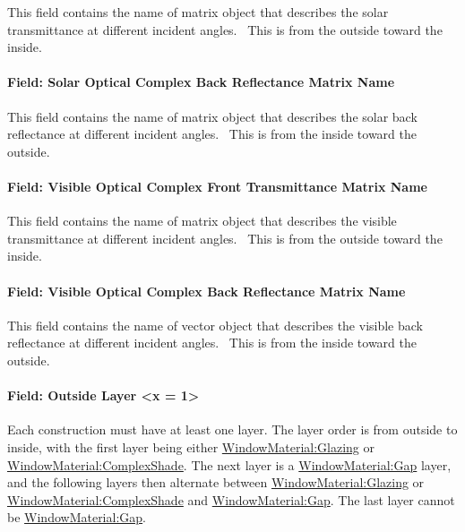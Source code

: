 This field contains the name of matrix object that describes the solar transmittance at different incident angles.~ This is from the outside toward the inside.

\paragraph{Field: Solar Optical Complex Back Reflectance Matrix Name}\label{field-solar-optical-complex-back-reflectance-matrix-name}

This field contains the name of matrix object that describes the solar back reflectance at different incident angles.~ This is from the inside toward the outside.

\paragraph{Field: Visible Optical Complex Front Transmittance Matrix Name}\label{field-visible-optical-complex-front-transmittance-matrix-name}

This field contains the name of matrix object that describes the visible transmittance at different incident angles.~ This is from the outside toward the inside.

\paragraph{Field: Visible Optical Complex Back Reflectance Matrix Name}\label{field-visible-optical-complex-back-reflectance-matrix-name}

This field contains the name of vector object that describes the visible back reflectance at different incident angles.~ This is from the inside toward the outside.

\paragraph{Field: Outside Layer \textless{}x = 1\textgreater{}}\label{field-outside-layer-x-1}

Each construction must have at least one layer. The layer order is from outside to inside, with the first layer being either \hyperref[windowmaterialglazing]{WindowMaterial:Glazing} or \hyperref[windowmaterialcomplexshade]{WindowMaterial:ComplexShade}. The next layer is a \hyperref[windowmaterialgap]{WindowMaterial:Gap} layer, and the following layers then alternate between \hyperref[windowmaterialglazing]{WindowMaterial:Glazing} or \hyperref[windowmaterialcomplexshade]{WindowMaterial:ComplexShade} and \hyperref[windowmaterialgap]{WindowMaterial:Gap}. The last layer cannot be \hyperref[windowmaterialgap]{WindowMaterial:Gap}.

